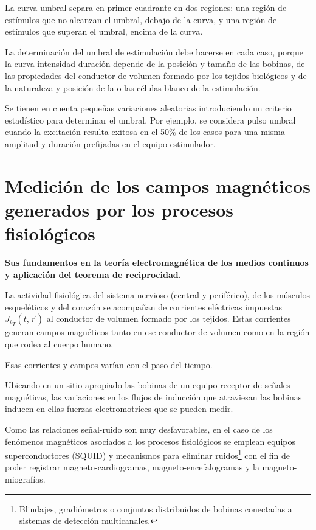 La curva umbral separa en primer cuadrante en dos regiones: una región de estímulos que no alcanzan el umbral, debajo de la curva, y una región de estímulos que superan el umbral, encima de la curva.

La determinación del umbral de estimulación debe hacerse en cada caso, porque la curva intensidad-duración depende de la posición y tamaño de las bobinas, de las propiedades del conductor de volumen formado por los tejidos biológicos y de la naturaleza y posición de la o las células blanco de la estimulación.

Se tienen en cuenta pequeñas variaciones aleatorias introduciendo un criterio estadístico para determinar el umbral. Por ejemplo, se considera pulso umbral cuando la excitación resulta exitosa en el 50\% de los casos para una misma amplitud y duración prefijadas en el equipo estimulador.

\section{Medición de los campos magnéticos generados por los procesos fisiológicos}

\textbf{Sus fundamentos en la teoría electromagnética de los medios continuos y  aplicación del teorema de reciprocidad.}

La actividad fisiológica del sistema nervioso (central y periférico), de los músculos esqueléticos y del corazón se acompañan de corrientes eléctricas impuestas ${J_{i}}_{T}(t, \overrightarrow{r})$ al conductor de volumen formado por los tejidos. Estas corrientes generan campos magnéticos tanto en ese conductor de volumen como en la región que rodea al cuerpo humano.

Esas corrientes y campos varían con el paso del tiempo.

Ubicando en un sitio apropiado las bobinas de un equipo receptor de señales magnéticas, las variaciones en los flujos de inducción que atraviesan las bobinas inducen en ellas fuerzas electromotrices que se pueden medir.

Como las relaciones señal-ruido son muy desfavorables, en el caso de los fenómenos magnéticos asociados a los procesos fisiológicos se emplean equipos superconductores (SQUID) y mecanismos para eliminar ruidos\footnote{Blindajes, gradiómetros o conjuntos distribuidos de bobinas conectadas a sistemas de detección multicanales.} con el fin de poder registrar magneto-cardiogramas, magneto-encefalogramas y la magneto-miografías.

